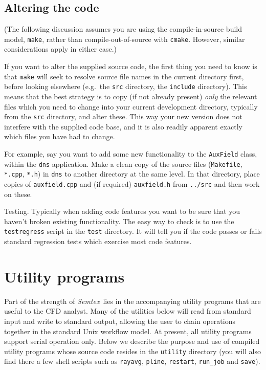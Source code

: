 \documentclass[11pt]{report}
\newcommand{\Semtex}{\emph{Semtex}} \newcommand{\Dog}{\emph{Dog}}
\newcommand{\eg}{e.g.\ } \newcommand{\CC}{\mathrm{c.c.}}
\begin{document}
\section{Altering the code}
\label{sec.alt}

(The following discussion assumes you are using the compile-in-source
build model, \ie \verb|make|, rather than compile-out-of-source with
\verb|cmake|. However, similar considerations apply in either case.)

If you want to alter the supplied source code, the first thing you
need to know is that \texttt{make} will seek to resolve source file
names in the current directory first, before looking elsewhere
(\eg the \texttt{src} directory, the \texttt{include} directory).
This means that the best strategy is to copy (if not already present)
\emph{only} the relevant files which you need to change into your
current development directory, typically from the \texttt{src}
directory, and alter these. This way your new version does not
interfere with the supplied code base, and it is also readily apparent
exactly which files you have had to change.

For example, say you want to add some new functionality to the
\texttt{AuxField} class, within the \texttt{dns} application. Make a
clean copy of the source files (\texttt{Makefile}, \texttt{*.cpp},
\texttt{*.h}) in \texttt{dns} to another directory at the same
level. In that directory, place copies of \texttt{auxfield.cpp} and (if
required) \texttt{auxfield.h} from \texttt{../src} and then work on
these.

Testing.  Typically when adding code features you want to be sure that
you haven't broken existing functionality.  The easy way to check is
to use the \verb|testregress| script in the \verb|test| directory. It
will tell you if the code passes or fails standard regression tests
which exercise most code features.


\chapter{Utility programs}
\label{ch.utilities}

Part of the strength of \Semtex\ lies in the accompanying utility
programs that are useful to the CFD analyst.  Many of the utilities
below will read from standard input and write to standard output,
allowing the user to chain operations together in the standard Unix
workflow model. At present, all utility programs support serial
operation only.  Below we describe the purpose and use of compiled
utility programs whose source code resides in the \verb|utility|
directory (you will also find there a few shell scripts such as
\verb|rayavg|, \verb|pline|, \verb|restart|, \verb|run_job| and
\verb|save|).
\end{document}
